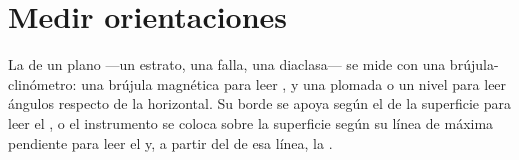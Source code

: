 \section{Medir orientaciones}

La  de un plano ---un estrato, una falla, una diaclasa--- se mide con una brújula-clinómetro:
una brújula magnética para leer , y una plomada o un nivel para leer ángulos respecto de la
horizontal. Su borde se apoya según el  de la superficie para leer el , o el instrumento se
coloca sobre la superficie según su línea de máxima pendiente para leer el  y, a partir del
 de esa línea, la .

